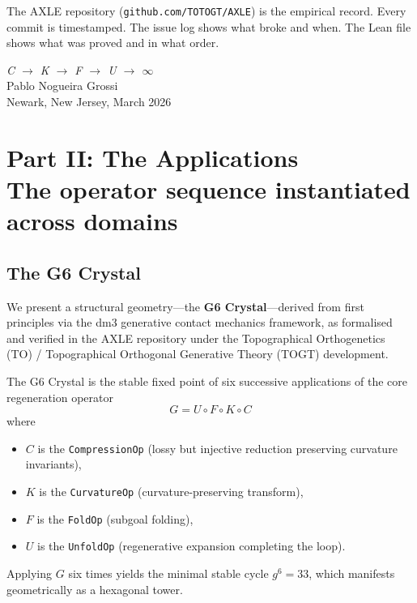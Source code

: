 \noindent The AXLE repository (\texttt{github.com/TOTOGT/AXLE})
is the empirical record. Every commit is timestamped. The issue
log shows what broke and when. The Lean file shows what was
proved and in what order.

\bigskip
\begin{flushright}
\textit{C \;$\to$\; K \;$\to$\; F \;$\to$\; U \;$\to$\; $\infty$}\\[0.3em]
Pablo Nogueira Grossi\\
Newark, New Jersey, March 2026
\end{flushright}

\part[Part II: The Applications]{Part II: The Applications\\[0.3em]
\large\normalfont The operator sequence instantiated across domains}

\chapter{The G6 Crystal}

We present a structural geometry---the \textbf{G6 Crystal}---derived from first principles via the dm3 generative contact mechanics framework, as formalised and verified in the AXLE repository under the Topographical Orthogenetics (TO) / Topographical Orthogonal Generative Theory (TOGT) development.

The G6 Crystal is the stable fixed point of six successive applications of the core regeneration operator
\[
G = U \circ F \circ K \circ C
\]
where
\begin{itemize}
\item $C$ is the \texttt{CompressionOp} (lossy but injective reduction preserving curvature invariants),
\item $K$ is the \texttt{CurvatureOp} (curvature-preserving transform),
\item $F$ is the \texttt{FoldOp} (subgoal folding),
\item $U$ is the \texttt{UnfoldOp} (regenerative expansion completing the loop).
\end{itemize}
Applying $G$ six times yields the minimal stable cycle $g^6 = 33$, which manifests geometrically as a hexagonal tower.

